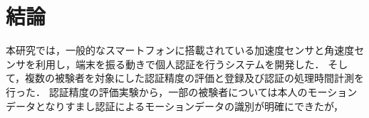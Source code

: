 \chapter{結論}
本研究では，一般的なスマートフォンに搭載されている加速度センサと角速度センサを利用し，端末を振る動きで個人認証を行うシステムを開発した．
そして，複数の被験者を対象にした認証精度の評価と登録及び認証の処理時間計測を行った．
認証精度の評価実験から，一部の被験者については本人のモーションデータとなりすまし認証によるモーションデータの識別が明確にできたが，
